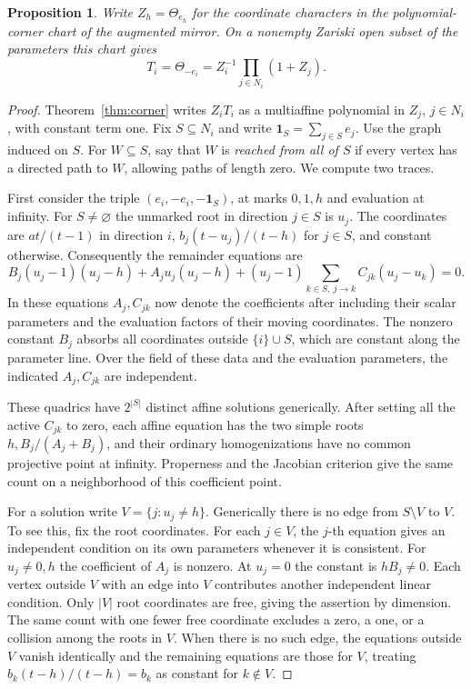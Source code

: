 \documentclass[11pt,reqno]{amsart}
\numberwithin{equation}{section}
\newtheorem{proposition}[theorem]{Proposition}
\theoremstyle{definition}
\theoremstyle{remark}
\begin{document}
\begin{proposition}\label{prop:generic-linear-partner}
Write \(Z_h=\Theta_{e_h}\) for the coordinate characters in the
polynomial-corner chart of the augmented mirror. On a nonempty
Zariski open subset of the parameters this chart gives
\[ T_i=\Theta_{-e_i}=Z_i^{-1}\prod_{j\in N_i}(1+Z_j). \]
\end{proposition}

\begin{proof}
Theorem~\ref{thm:corner} writes \(Z_i T_i\) as a multiaffine
polynomial in \(Z_j\), \(j\in N_i\), with constant term one.
Fix \(S\subseteq N_i\) and write \(\mathbf1_S=\sum_{j\in S}e_j\).
Use the graph induced on \(S\). For \(W\subseteq S\), say that \(W\)
is \emph{reached from all of \(S\)} if every vertex has a directed path to
\(W\), allowing paths of length zero. We compute two traces.

First consider the triple \((e_i,-e_i,-\mathbf1_S)\), at marks
\(0,1,h\) and evaluation at infinity. For \(S\ne\varnothing\) the
unmarked root in direction \(j\in S\) is \(u_j\). The coordinates
are \(a t/(t-1)\) in direction \(i\),
\(b_j(t-u_j)/(t-h)\) for \(j\in S\), and constant otherwise.
Consequently the remainder equations are
\[ B_j(u_j-1)(u_j-h)+A_j u_j(u_j-h) +(u_j-1)\sum_{k\in S,\ j\to k} C_{jk}(u_j-u_k)=0 . \]
In these equations \(A_j,C_{jk}\) now denote the coefficients after
including their scalar parameters and the evaluation factors of
their moving coordinates. The nonzero constant \(B_j\) absorbs all
coordinates outside \(\{i\}\cup S\), which are constant along the
parameter line. Over the field of these data and the evaluation
parameters, the indicated \(A_j,C_{jk}\) are independent.

These quadrics have \(2^{|S|}\) distinct affine solutions generically.
After setting all the active \(C_{jk}\) to zero, each affine equation
has the two simple roots \(h,B_j/(A_j+B_j)\), and their ordinary
homogenizations have no common projective point at infinity. Properness
and the Jacobian criterion give the same count on a neighborhood of
this coefficient point.

For a solution write \(V=\{j:u_j\ne h\}\). Generically there is no
edge from \(S\setminus V\) to \(V\). To see this, fix the root
coordinates. For each \(j\in V\), the \(j\)-th equation gives an independent
condition on its own parameters whenever it is consistent. For \(u_j\ne0,h\)
the coefficient of \(A_j\) is nonzero. At \(u_j=0\) the constant
is \(hB_j\ne0\). Each vertex outside \(V\) with an edge into \(V\) contributes another independent linear condition. Only \(|V|\) root
coordinates are free, giving the assertion by dimension. The same
count with one fewer free coordinate excludes a zero, a one, or a
collision among the roots in \(V\). When there is no such edge, the
equations outside \(V\) vanish identically and the remaining equations
are those for \(V\), treating \(b_k(t-h)/(t-h)=b_k\) as constant
for \(k\notin V\).


\end{proof}
\end{document}
